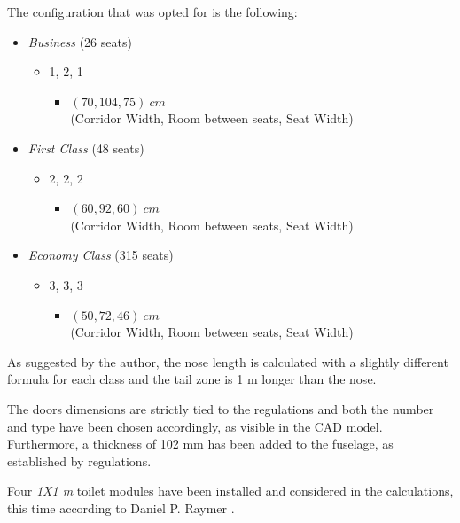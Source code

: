 \documentclass{article}
\begin{document}
The configuration that was opted for is the following: 
\begin{itemize}
    \item \textit{Business} (26 seats)
        \begin{itemize}
            \item 1, 2, 1
            \begin{itemize}
                \item $\left ( 70, 104, 75 \right ) \ cm$ \\ (Corridor Width, Room between seats, Seat Width)
            \end{itemize}
        \end{itemize}
    \item \textit{First Class} (48 seats)
        \begin{itemize}
            \item 2, 2, 2
            \begin{itemize}
                \item $\left ( 60, 92, 60 \right ) \ cm$ \\ (Corridor Width, Room between seats, Seat Width)
            \end{itemize}
        \end{itemize}
    \item \textit{Economy Class} (315 seats)
        \begin{itemize}
            \item 3, 3, 3
            \begin{itemize}
                \item $\left ( 50, 72, 46 \right ) \ cm$ \\ (Corridor Width, Room between seats, Seat Width)
            \end{itemize}
        \end{itemize}
\end{itemize}
\clearpage

As suggested by the author, the nose length is calculated with a slightly different
formula for each class and the tail zone is 1 m longer than the nose. 

The doors dimensions are strictly tied to the regulations and both the number and type have been 
chosen accordingly, as visible in the CAD model. 
Furthermore, a thickness of 102 mm has been added to the fuselage, as established by regulations. 

Four \textit{1X1 m} toilet modules have been installed and considered in the calculations, this time according to Daniel P. Raymer \autocite{Raymer_Daniel}.\\ 
\end{document}
